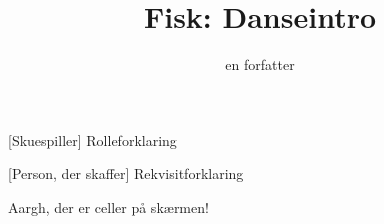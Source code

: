 \documentclass[a4paper,11pt]{article}
\title{Fisk: Danseintro}
\author{en forfatter}
\begin{document}
\maketitle

\begin{roles}
    [Skuespiller] Rolleforklaring
\end{roles}

\begin{props}
    [Person, der skaffer] Rekvisitforklaring
\end{props}


\begin{sketch}

Aargh, der er celler på skærmen!

\end{sketch}
\end{document}
